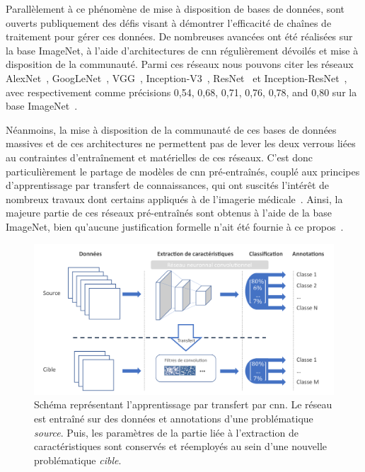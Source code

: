 Parallèlement à ce phénomène de mise à disposition de bases de données, sont ouverts publiquement des défis visant à démontrer l'efficacité de chaînes de traitement pour gérer ces données. De nombreuses avancées ont été réalisées sur la base ImageNet, à l'aide d'architectures de \gls{cnn} régulièrement dévoilés et mise à disposition de la communauté. Parmi ces réseaux nous pouvons citer les réseaux AlexNet~\cite{Krizhevsky2012}, GoogLeNet~\cite{Szegedy2015}, VGG~\cite{Simonyan2014}, Inception-V3~\cite{Szegedy2016}, ResNet~\cite{He2016} et Inception-ResNet~\cite{Szegedy2017}, avec respectivement comme précisions 0,54, 0,68, 0,71, 0,76, 0,78, and 0,80 sur la base ImageNet~\cite{Canziani2016}.\par

Néanmoins, la mise à disposition de la communauté de ces bases de données massives et de ces architectures ne permettent pas de lever les deux verrous liées au contraintes d'entraînement et matérielles de ces réseaux. C'est donc particulièrement le partage de modèles de \gls{cnn} pré-entraînés, couplé aux principes d'apprentissage par transfert de connaissances, qui ont suscités l'intérêt de nombreux travaux dont certains appliqués à de l'imagerie médicale~\cite{Litjens2017}. Ainsi, la majeure partie de ces réseaux pré-entraînés sont obtenus à l'aide de la base ImageNet, bien qu'aucune justification formelle n'ait été fournie à ce propos~\cite{Huh2016}.\par
 
\begin{figure}[H]
    \centering
    \includegraphics[width=\linewidth]{contents/chapter_4/resources/scheme_transfer_learning.pdf}
    \caption{Schéma représentant l'apprentissage par transfert par \gls{cnn}. Le réseau est entraîné sur des données et annotations d'une problématique \textit{source}. Puis, les paramètres de la partie liée à l'extraction de caractéristiques sont conservés et réemployés au sein d'une nouvelle problématique \textit{cible}.}
    \label{fig:scheme_transfer_learning}
\end{figure}\par

